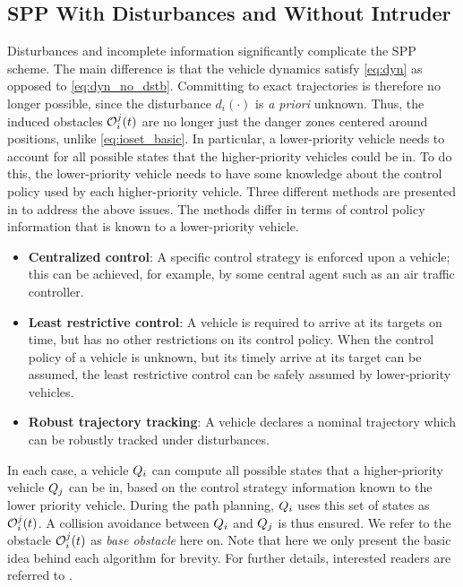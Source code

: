 \subsection{SPP With Disturbances and Without Intruder\label{sec:distb}}
Disturbances and incomplete information significantly complicate the SPP scheme. The main difference is that the vehicle dynamics satisfy \eqref{eq:dyn} as opposed to \eqref{eq:dyn_no_dstb}. Committing to exact trajectories is therefore no longer possible, since the disturbance $d_i(\cdot)$ is \textit{a priori} unknown. Thus, the induced obstacles $\mathcal{O}_i^j(t)$ are no longer just the danger zones centered around positions, unlike \eqref{eq:ioset_basic}. In particular, a lower-priority vehicle needs to account for all possible states that the higher-priority vehicles could be in. To do this, the lower-priority vehicle needs to have some knowledge about the control policy used by each higher-priority vehicle. Three different methods are presented in \cite{Bansal2017} to address the above issues. The methods differ in terms of control policy information that is known to a lower-priority vehicle.
\begin{itemize}
\item \textbf{Centralized control}: A specific control strategy is enforced upon a vehicle; this can be achieved, for example, by some central agent such as an air traffic controller. 
\item \textbf{Least restrictive control}: A vehicle is required to arrive at its targets on time, but has no other restrictions on its control policy. When the control policy of a vehicle is unknown, but its timely arrive at its target can be assumed, the least restrictive control can be safely assumed by lower-priority vehicles.
\item \textbf{Robust trajectory tracking}: A vehicle declares a nominal trajectory which can be robustly tracked under disturbances.
\end{itemize}
In each case, a vehicle $Q_i$ can compute all possible states that a higher-priority vehicle $Q_j$ can be in, based on the control strategy information known to the lower priority vehicle. During the path planning, $Q_i$ uses this set of states as $\mathcal{O}_i^j(t)$. A collision avoidance between $Q_i$ and $Q_j$ is thus ensured. We refer to the obstacle $\mathcal{O}_i^j(t)$ as \textit{base obstacle} here on. Note that here we only present the basic idea behind each algorithm for brevity. For further details, interested readers are referred to \cite{Bansal2017}.
